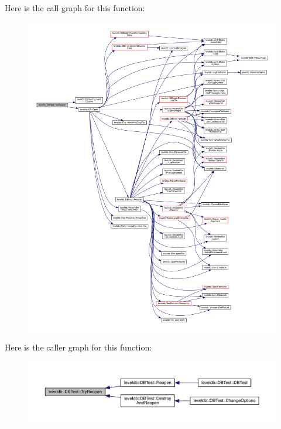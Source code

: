 Here is the call graph for this function\+:\nopagebreak
\begin{figure}[H]
\begin{center}
\leavevmode
\includegraphics[width=350pt]{classleveldb_1_1_d_b_test_aee588b2d13db6be2a651a8fabeac5c79_cgraph}
\end{center}
\end{figure}




Here is the caller graph for this function\+:\nopagebreak
\begin{figure}[H]
\begin{center}
\leavevmode
\includegraphics[width=350pt]{classleveldb_1_1_d_b_test_aee588b2d13db6be2a651a8fabeac5c79_icgraph}
\end{center}
\end{figure}


